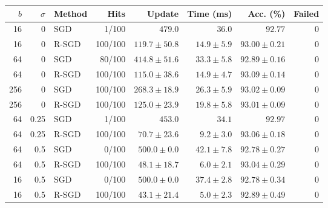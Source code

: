 \begin{tabular}{rrlrrrrr}
\hline
$b$ & $\sigma$ & Method & Hits & Update & Time (ms) & Acc. (\%) & Failed \\
\hline
16 & 0 & SGD & 1/100 & $479.0$ & $36.0$ & $92.77$ & 0 \\
16 & 0 & R-SGD & 100/100 & $119.7 \pm 50.8$ & $14.9 \pm 5.9$ & $93.00 \pm 0.21$ & 0 \\
64 & 0 & SGD & 80/100 & $414.8 \pm 51.6$ & $33.3 \pm 5.8$ & $92.89 \pm 0.16$ & 0 \\
64 & 0 & R-SGD & 100/100 & $115.0 \pm 38.6$ & $14.9 \pm 4.7$ & $93.09 \pm 0.14$ & 0 \\
256 & 0 & SGD & 100/100 & $268.3 \pm 18.9$ & $26.3 \pm 5.9$ & $93.02 \pm 0.09$ & 0 \\
256 & 0 & R-SGD & 100/100 & $125.0 \pm 23.9$ & $19.8 \pm 5.8$ & $93.01 \pm 0.09$ & 0 \\
64 & 0.25 & SGD & 1/100 & $453.0$ & $34.1$ & $92.97$ & 0 \\
64 & 0.25 & R-SGD & 100/100 & $70.7 \pm 23.6$ & $9.2 \pm 3.0$ & $93.06 \pm 0.18$ & 0 \\
64 & 0.5 & SGD & 0/100 & $500.0 \pm 0.0$ & $42.1 \pm 7.8$ & $92.78 \pm 0.27$ & 0 \\
64 & 0.5 & R-SGD & 100/100 & $48.1 \pm 18.7$ & $6.0 \pm 2.1$ & $93.04 \pm 0.29$ & 0 \\
16 & 0.5 & SGD & 0/100 & $500.0 \pm 0.0$ & $37.4 \pm 2.8$ & $92.78 \pm 0.34$ & 0 \\
16 & 0.5 & R-SGD & 100/100 & $43.1 \pm 21.4$ & $5.0 \pm 2.3$ & $92.89 \pm 0.49$ & 0 \\
\hline
\end{tabular}
